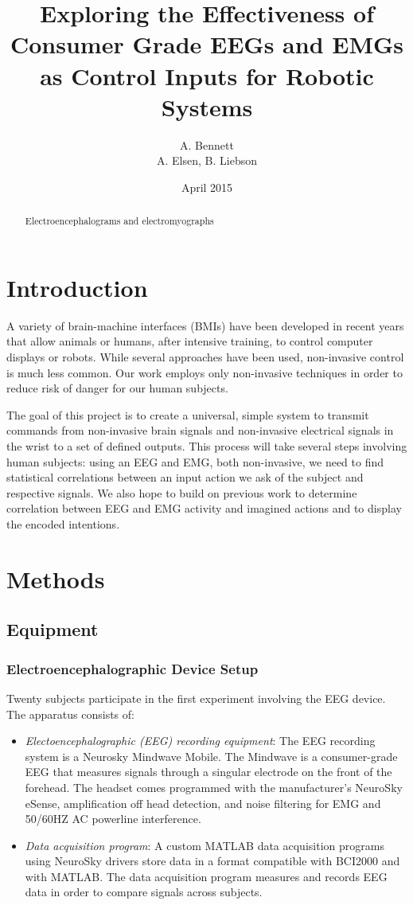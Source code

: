 \documentclass[journal]{IEEEtran}
\title{Exploring the Effectiveness of Consumer Grade EEGs and EMGs as Control Inputs for Robotic Systems}
\author{A. Bennett \\ A. Elsen, B. Liebson}
\date{April 2015}
\begin{document}
\maketitle

\begin{abstract}
Electroencephalograms and electromyographs 
\end{abstract}

\section{Introduction}
A variety of brain-machine interfaces (BMIs) have been developed in recent years that allow animals or humans, after intensive training, to control computer displays or robots.  While several approaches have been used, non-invasive control is much less common. Our work employs only non-invasive techniques in order to reduce risk of danger for our human subjects.

The goal of this project is to create a universal, simple system to transmit commands from non-invasive brain signals and non-invasive electrical signals in the wrist to a set of defined outputs. This process will take several steps involving human subjects: using an EEG and EMG, both non-invasive, we need to find statistical correlations between an input action we ask of the subject and respective signals. We also hope to build on previous work to determine correlation between EEG and EMG activity and imagined actions and to display the encoded intentions.

\section{Methods}
\subsection{Equipment}
\subsubsection{Electroencephalographic Device Setup}
Twenty subjects participate in the first experiment involving the EEG device.
The apparatus consists of:
\begin{itemize}
    \item \textit{Electoencephalographic (EEG) recording equipment}: The EEG recording system is a Neurosky Mindwave Mobile. The Mindwave is a consumer-grade EEG that measures signals through a singular electrode on the front of the forehead. The headset comes programmed with the manufacturer’s NeuroSky eSense, amplification off head detection, and noise filtering for EMG and 50/60HZ AC powerline interference. 
    \item \textit{Data acquisition program}: A custom MATLAB data acquisition programs using NeuroSky drivers store data in a format compatible with BCI2000 and with MATLAB.  The data acquisition program measures and records EEG data in order to compare signals across subjects.
\end{itemize}
\end{document}
